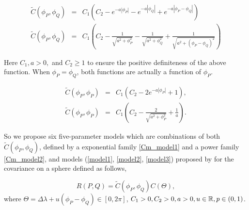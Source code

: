 			\begin{eqnarray}
				\label{Cm_model1}
				\tilde{C}(\phi_P, \phi_Q) &=& C_1(C_2 - e^{-a|\phi_P|} - e^{-a|\phi_Q|} + e^{-a|\phi_P - \phi_Q|}) \\
				\label{Cm_model2}
				\tilde{C}(\phi_P, \phi_Q) &=& C_1\left(C_2 - \frac{1}{\sqrt{a^2+\phi_P^2}} - \frac{1}{\sqrt{a^2+\phi_Q^2}} + \frac{1}{\sqrt{a^2+(\phi_P-\phi_Q)^2}}\right)
			\end{eqnarray}
					      		      
			Here $C_1, a > 0,$ and $C_2 \ge 1$ to ensure the positive definiteness of the above function. When $\phi_P = \phi_Q$, both functions are actually a function of $\phi_P$.
					      		      
			\begin{eqnarray*}
				\tilde{C}(\phi_P, \phi_P) &=& C_1(C_2 - 2e^{-a|\phi_P|} + 1), \\
				\tilde{C}(\phi_P, \phi_P) &=& C_1\left(C_2 - \frac{2}{\sqrt{a^2+\phi_P^2}} + \frac{1}{a}\right).
			\end{eqnarray*}
			
			
					
			So we propose six five-parameter models which are combinations of both $\tilde{C}(\phi_P, \phi_Q)$, defined by a exponential family \ref{Cm_model1} and a power family \ref{Cm_model2}, and models (\ref{model1}, \ref{model2}, \ref{model3}) proposed by \cite{Huang2012} for the covariance on a sphere defined as follows,
					
			\[
				R(P,Q) = \tilde{C}(\phi_P, \phi_Q) C(\Theta),
			\]
			where $\Theta=\Delta\lambda+u(\phi_P-\phi_Q) \in [0,2\pi ] $, $C_1 > 0, C_2 > 0, a>0, u\in \mathbb{R}, p\in(0,1)$. 
					
